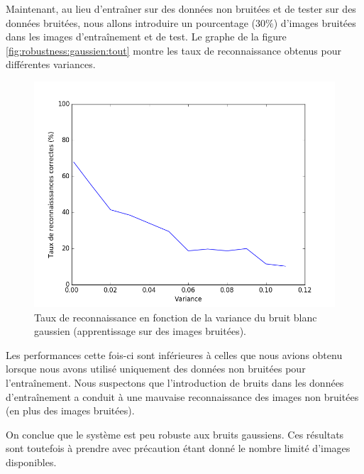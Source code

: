 Maintenant, au lieu d'entraîner sur des données non bruitées et de tester sur des 
données bruitées, nous allons introduire un pourcentage ($30\%$) d'images bruitées
dans les images d'entraînement et de test. Le graphe de la figure \ref{fig:robustness:gaussien:tout} 
montre les taux de reconnaissance obtenus pour différentes variances.
\begin{figure}[H]
    \centering
    \includegraphics[scale=0.5]{images/robustesse_gaussien_tout}
    \caption{Taux de reconnaissance en fonction de la variance du bruit blanc gaussien
    (apprentissage sur des images bruitées).}
    \label{fig:robustness:gaussien:touxt}
\end{figure}
Les performances cette fois-ci sont inférieures à celles que nous avions obtenu lorsque nous
avons utilisé uniquement des données non bruitées pour l'entraînement. Nous suspectons que 
l'introduction de bruits dans les données d'entraînement a conduit à une mauvaise reconnaissance
des images non bruitées (en plus des images bruitées).

On conclue que le système est peu robuste aux bruits gaussiens. 
Ces résultats sont toutefois à prendre avec
précaution étant donné le nombre limité d'images disponibles.

